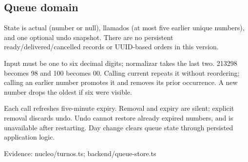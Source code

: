 \subsection{Queue domain}

State is actual (number or null), llamados (at most five earlier unique numbers), and one optional undo snapshot. There are no persistent ready/delivered/cancelled records or UUID-based orders in this version.

Input must be one to six decimal digits; normalizar takes the last two. 213298 becomes 98 and 100 becomes 00. Calling current repeats it without reordering; calling an earlier number promotes it and removes its prior occurrence. A new number drops the oldest if six were visible.

Each call refreshes five-minute expiry. Removal and expiry are silent; explicit removal discards undo. Undo cannot restore already expired numbers, and is unavailable after restarting. Day change clears queue state through persisted application logic.

Evidence: nucleo/turnos.ts; backend/queue-store.ts
